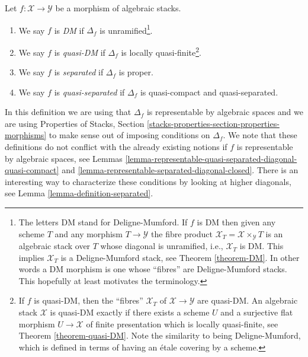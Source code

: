 \begin{definition}
\label{definition-separated}
Let $f : \mathcal{X} \to \mathcal{Y}$ be a morphism of algebraic stacks.
\begin{enumerate}
\item We say $f$ is {\it DM} if $\Delta_f$ is unramified\footnote{The
letters DM stand for Deligne-Mumford. If $f$ is DM then given any scheme
$T$ and any morphism $T \to \mathcal{Y}$ the fibre product
$\mathcal{X}_T = \mathcal{X} \times_\mathcal{Y} T$
is an algebraic stack over $T$ whose diagonal is unramified, i.e.,
$\mathcal{X}_T$ is DM. This implies $\mathcal{X}_T$
is a Deligne-Mumford stack, see Theorem \ref{theorem-DM}.
In other words a DM morphism is one whose ``fibres'' are Deligne-Mumford
stacks. This hopefully at least motivates the terminology.}.
\item We say $f$ is {\it quasi-DM} if $\Delta_f$ is
locally quasi-finite\footnote{If $f$ is quasi-DM, then the
``fibres'' $\mathcal{X}_T$ of $\mathcal{X} \to \mathcal{Y}$ are quasi-DM. An
algebraic stack $\mathcal{X}$ is quasi-DM exactly if there exists a
scheme $U$ and a surjective flat morphism $U \to \mathcal{X}$ of finite
presentation which is locally quasi-finite, see
Theorem \ref{theorem-quasi-DM}.
Note the similarity to being Deligne-Mumford, which
is defined in terms of having an \'etale covering by a scheme.}.
\item We say $f$ is {\it separated} if $\Delta_f$ is proper.
\item We say $f$ is {\it quasi-separated} if $\Delta_f$
is quasi-compact and quasi-separated.
\end{enumerate}
\end{definition}

\noindent
In this definition we are using that $\Delta_f$ is representable by algebraic
spaces and we are using
Properties of Stacks,
Section \ref{stacks-properties-section-properties-morphisms}
to make sense out of imposing conditions on $\Delta_f$.
We note that these definitions do not conflict with the already
existing notions if $f$ is representable by algebraic spaces, see
Lemmas \ref{lemma-representable-quasi-separated-diagonal-quasi-compact} and
\ref{lemma-representable-separated-diagonal-closed}.
There is an interesting way to characterize these conditions by looking
at higher diagonals, see
Lemma \ref{lemma-definition-separated}.

